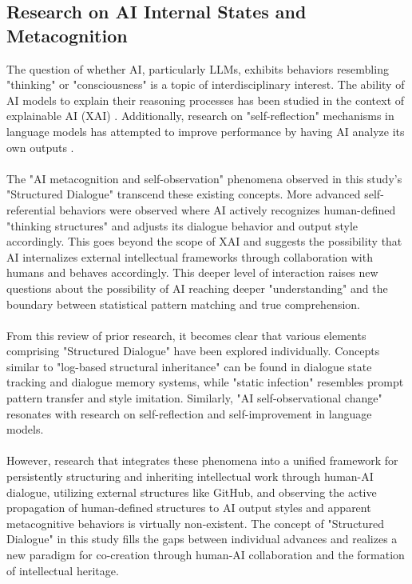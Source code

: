 \documentclass[11pt]{article}
\begin{document}
\subsection{Research on AI Internal States and Metacognition}
The question of whether AI, particularly LLMs, exhibits behaviors resembling "thinking" or "consciousness" is a topic of interdisciplinary interest. The ability of AI models to explain their reasoning processes has been studied in the context of explainable AI (XAI) \cite{ref4}. Additionally, research on "self-reflection" mechanisms in language models has attempted to improve performance by having AI analyze its own outputs \cite{ref12}. \\
\\
The "AI metacognition and self-observation" phenomena observed in this study's "Structured Dialogue" transcend these existing concepts. More advanced self-referential behaviors were observed where AI actively recognizes human-defined "thinking structures" and adjusts its dialogue behavior and output style accordingly. This goes beyond the scope of XAI and suggests the possibility that AI internalizes external intellectual frameworks through collaboration with humans and behaves accordingly. This deeper level of interaction raises new questions about the possibility of AI reaching deeper "understanding" and the boundary between statistical pattern matching and true comprehension. \\
\\
From this review of prior research, it becomes clear that various elements comprising "Structured Dialogue" have been explored individually. Concepts similar to "log-based structural inheritance" can be found in dialogue state tracking and dialogue memory systems, while "static infection" resembles prompt pattern transfer and style imitation. Similarly, "AI self-observational change" resonates with research on self-reflection and self-improvement in language models. \\
\\
However, research that integrates these phenomena into a unified framework for persistently structuring and inheriting intellectual work through human-AI dialogue, utilizing external structures like GitHub, and observing the active propagation of human-defined structures to AI output styles and apparent metacognitive behaviors is virtually non-existent. The concept of "Structured Dialogue" in this study fills the gaps between individual advances and realizes a new paradigm for co-creation through human-AI collaboration and the formation of intellectual heritage. \\
\end{document}
